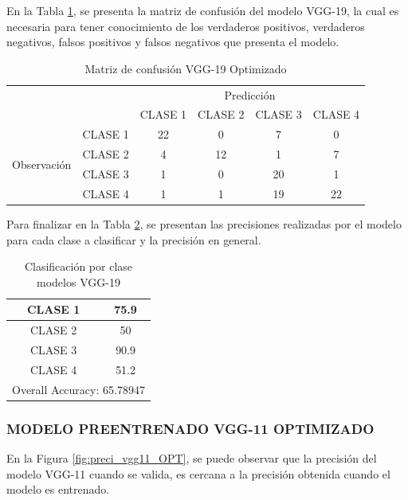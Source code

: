 	\newpage
	En la Tabla \ref{tab:MC_VGG19_OPT}, se presenta la matriz de confusión del modelo VGG-19, la cual es necesaria para tener conocimiento de los verdaderos positivos, verdaderos negativos, falsos positivos y falsos negativos que presenta el modelo.
		\begin{table}[htbp]
			\centering
			\begin{tabular}{|c|l|c|c|c|c|}
				\hline
				\multicolumn{2}{|c|}{\multirow{2}[4]{*}{}} & \multicolumn{4}{c|}{Predicción} \bigstrut\\
				\cline{3-6}    \multicolumn{2}{|c|}{} & CLASE 1 & CLASE 2 & CLASE 3 & CLASE 4 \bigstrut\\
				\hline
				\multirow{4}[8]{*}{\begin{sideways}Observación\end{sideways}} & CLASE 1 & 22    & 0     & 7    & 0 \bigstrut\\
				\cline{2-6}          & CLASE 2 & 4     & 12     & 1    & 7 \bigstrut\\
				\cline{2-6}          & CLASE 3 & 1     & 0     & 20    & 1 \bigstrut\\
				\cline{2-6}          & CLASE 4 & 1     & 1     & 19    & 22 \bigstrut\\
				\hline
			\end{tabular}%
			\caption{Matriz de confusión VGG-19 Optimizado }
			\label{tab:MC_VGG19_OPT}%
		\end{table}%
	
	Para finalizar en la Tabla \ref{tab:VGG19optclases}, se presentan las precisiones realizadas por el modelo para cada clase a clasificar y la precisión en general.
		\begin{table}[htbp]
			\centering
			\begin{tabular}{|c|c|}
				\hline
				CLASE 1 & 75.9 \bigstrut\\
				\hline
				CLASE 2 & 50 \bigstrut\\
				\hline
				CLASE 3 & 90.9 \bigstrut\\
				\hline
				CLASE 4 & 51.2 \bigstrut\\
				\hline
				\multicolumn{2}{|c|}{Overall Accuracy: 65.78947} \bigstrut\\
				\hline
			\end{tabular}%
			\caption{Clasificación por clase modelos VGG-19}
			\label{tab:VGG19optclases}%
		\end{table}%

\newpage	
	\subsubsection{\MakeUppercase{Modelo preentrenado VGG-11 optimizado}}
	En la Figura \ref{fig:preci_vgg11_OPT}, se puede observar que la precisión del modelo VGG-11 cuando se valida, es cercana a la precisión obtenida cuando el modelo es entrenado.
	
